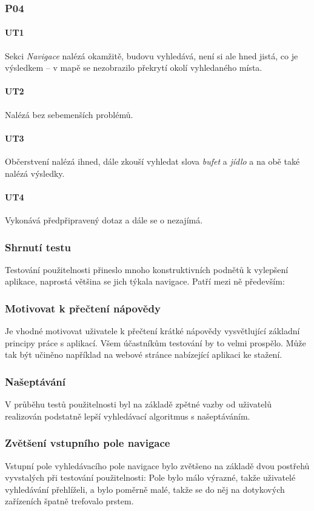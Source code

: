 \subsubsection*{P04}
\paragraph*{UT1}
Sekci \textit{Navigace} nalézá okamžitě, budovu vyhledává, není si ale hned jistá, co je výsledkem -- v mapě se nezobrazilo překrytí okolí vyhledaného místa. 
\paragraph*{UT2}
Nalézá bez sebemenších problémů.
\paragraph*{UT3}
Občerstvení nalézá ihned, dále zkouší vyhledat slova \textit{bufet} a \textit{jídlo} a na obě také nalézá výsledky.
\paragraph*{UT4}
Vykonává předpřipravený dotaz a dále se o  nezajímá.

\subsubsection{Shrnutí testu}
Testování použitelnosti přineslo mnoho konstruktivních podnětů k vylepšení aplikace, naprostá většina se jich týkala navigace. Patří mezi ně především:
\subsubsection*{Motivovat k přečtení nápovědy}
Je vhodné motivovat uživatele k přečtení krátké nápovědy vysvětlující základní principy práce s aplikací. Všem účastníkům testování by to velmi prospělo. Může tak být učiněno například na webové stránce nabízející aplikaci ke stažení.
\subsubsection*{Našeptávání}
V průběhu testů použitelnosti byl na základě zpětné vazby od uživatelů realizován podstatně lepší vyhledávací algoritmus s našeptáváním.
\subsubsection*{Zvětšení vstupního pole navigace}
Vstupní pole vyhledávacího pole navigace bylo zvětšeno na základě dvou postřehů vyvstalých při testování použitelnosti: Pole bylo málo výrazné, takže uživatelé vyhledávání přehlíželi, a bylo poměrně malé, takže se do něj na dotykových zařízeních špatně trefovalo prstem.
